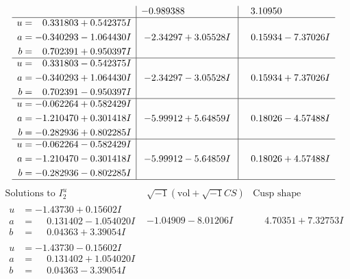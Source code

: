 \documentclass[1p]{elsarticle_modified}
\theoremstyle{definition}
\newcommand{\I}{\sqrt{-1}}
\begin{document}
$$\begin{array}{c|c|c}
 & -0.989388\phantom{ +0.000000I} & \phantom{-}3.10950\phantom{ +0.000000I} \\ \hline\begin{aligned}
u &= \phantom{-}0.331803 + 0.542375 I \\
a &= -0.340293 - 1.064430 I \\
b &= \phantom{-}0.702391 + 0.950397 I\end{aligned}
 & -2.34297 + 3.05528 I & \phantom{-}0.15934 - 7.37026 I \\ \hline\begin{aligned}
u &= \phantom{-}0.331803 - 0.542375 I \\
a &= -0.340293 + 1.064430 I \\
b &= \phantom{-}0.702391 - 0.950397 I\end{aligned}
 & -2.34297 - 3.05528 I & \phantom{-}0.15934 + 7.37026 I \\ \hline\begin{aligned}
u &= -0.062264 + 0.582429 I \\
a &= -1.210470 + 0.301418 I \\
b &= -0.282936 + 0.802285 I\end{aligned}
 & -5.99912 + 5.64859 I & \phantom{-}0.18026 - 4.57488 I \\ \hline\begin{aligned}
u &= -0.062264 - 0.582429 I \\
a &= -1.210470 - 0.301418 I \\
b &= -0.282936 - 0.802285 I\end{aligned}
 & -5.99912 - 5.64859 I & \phantom{-}0.18026 + 4.57488 I\\
 \hline 
 \end{array}$$\newpage$$\begin{array}{c|c|c}  
\text{Solutions to }I^u_{2}& \I (\text{vol} + \sqrt{-1}CS) & \text{Cusp shape}\\
 \hline 
\begin{aligned}
u &= -1.43730 + 0.15602 I \\
a &= \phantom{-}0.131402 - 1.054020 I \\
b &= \phantom{-}0.04363 + 3.39054 I\end{aligned}
 & -1.04909 - 8.01206 I & \phantom{-}4.70351 + 7.32753 I \\ \hline\begin{aligned}
u &= -1.43730 - 0.15602 I \\
a &= \phantom{-}0.131402 + 1.054020 I \\
b &= \phantom{-}0.04363 - 3.39054 I\end{aligned}

\end{array}$$
\end{document}
